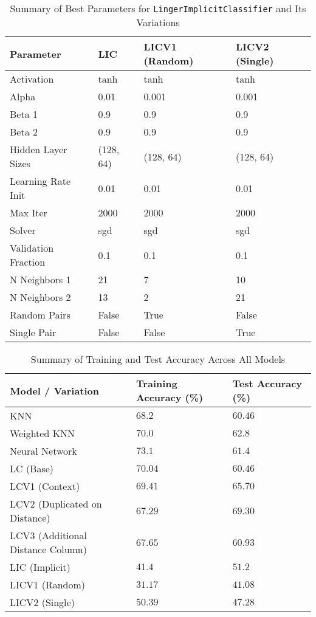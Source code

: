 \documentclass[a4paper, 12pt]{report}
\begin{document}
\begin{table}[H]
    \centering
    \caption{Summary of Best Parameters for \texttt{LingerImplicitClassifier} and Its Variations}
    \label{tab:best_parameters_LIC_variations_exp1}
    \begin{tabular}{|l|l|l|l|}
    \hline
    \textbf{Parameter} & \textbf{LIC} & \textbf{LICV1 (Random)} & \textbf{LICV2 (Single)} \\
    \hline
    Activation & tanh & tanh & tanh \\
    Alpha & 0.01 & 0.001 & 0.001 \\
    Beta 1 & 0.9 & 0.9 & 0.9 \\
    Beta 2 & 0.9 & 0.9 & 0.9 \\
    Hidden Layer Sizes & (128, 64) & (128, 64) & (128, 64) \\
    Learning Rate Init & 0.01 & 0.01 & 0.01 \\
    Max Iter & 2000 & 2000 & 2000 \\
    Solver & sgd & sgd & sgd \\
    Validation Fraction & 0.1 & 0.1 & 0.1 \\
    N Neighbors 1 & 21 & 7 & 10 \\
    N Neighbors 2 & 13 & 2 & 21 \\
    Random Pairs & False & True & False \\
    Single Pair & False & False & True \\
    \hline
    \end{tabular}
\end{table}
\clearpage

\begin{table}[H]
    \centering
    \caption{Summary of Training and Test Accuracy Across All Models}
    \label{tab:summary_accuracy_all_models_exp1}
    \begin{tabular}{|lll|}
    \toprule
    \textbf{Model / Variation} & \textbf{Training Accuracy (\%)} & \textbf{Test Accuracy (\%)} \\
    \midrule
    KNN & $68.2$ & $60.46$ \\
    Weighted KNN & $70.0$ & $62.8$ \\
    Neural Network & $73.1$ & $61.4$ \\
    LC (Base) & $70.04$ & $60.46$ \\
    LCV1 (Context) & $69.41$ & $65.70$ \\
    LCV2 (Duplicated on Distance) & $67.29$ & $\mathbf{69.30}$ \\
    LCV3 (Additional Distance Column) & $67.65$ & $60.93$ \\
    LIC (Implicit) & $41.4$ & $51.2$ \\
    LICV1 (Random) & $31.17$ & $41.08$ \\
    LICV2 (Single) & $50.39$ & $47.28$ \\
    \bottomrule
    \end{tabular}
\end{table}
\end{document}
